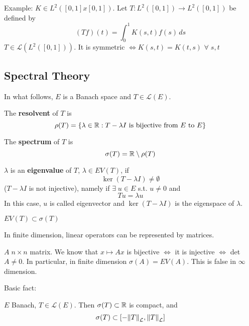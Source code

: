 Example: \(K \in L^2([0, 1]x[0, 1])\). Let \(T: L^2([0, 1]) \to L^2([0, 1])\) be defined by 
\[
    (Tf)(t) = \int_0^1 K(s, t) f(s) \,ds
\]
\(T \in \mathcal{L}(L^2([0, 1]))\). It is symmetric \(\Leftrightarrow K(s, t) = K(t, s)\) \(\forall \; s, t\)

\subsection{Spectral Theory}
In what follows, \(E\) is a Banach space and \(T \in \mathcal{L}(E)\).

\begin{definition}
    The \textbf{resolvent} of \(T\) is 
    \[
        \rho(T) = \{ \lambda \in \mathbb{R}: T - \lambda I \text{ is bijective from } E \text{ to } E\}
    \]
\end{definition}
\begin{definition}
    The \textbf{spectrum} of \(T\) is    
    \[
        \sigma(T) = \mathbb{R} \setminus \rho(T)
    \]
\end{definition}
\begin{definition}
    \(\lambda\) is an \textbf{eigenvalue} of \(T\), \(\lambda \in EV(T) \), if 
    \[
        \ker(T- \lambda I) \neq \emptyset
    \]
    (\(T - \lambda I\) is not injective), namely if \(\exists \; u \in E\) s.t. \(u \neq 0\) and
    \[
        T u = \lambda u
    \]
    In this case, \(u\) is called eigenvector and \(\ker(T-\lambda I)\) is the eigenspace of \(\lambda\).
\end{definition}
\begin{remark}
    \(EV(T) \subset \sigma(T)\)
\end{remark}
\begin{remark}
    In finite dimension, linear operators can be represented by matrices.

    \(A \; n \times n\) matrix. We know that \(x \mapsto Ax\) is bijective \(\Leftrightarrow \) it is injective \(\Leftrightarrow \) det\(A \neq 0\). In particular, in finite dimension \(\sigma(A) = EV(A)\). This is false in \(\infty \) dimension.
\end{remark}

Basic fact:
\begin{theorem}
    \(E\) Banach, \(T \in \mathcal{L}(E)\). Then \(\sigma(T) \subset \mathbb{R}\) is compact, and 
    \[
        \sigma(T) \subset \left[ - \norm{T}_\mathcal{L}, \norm{T}_\mathcal{L} \right]
    \]
\end{theorem}

